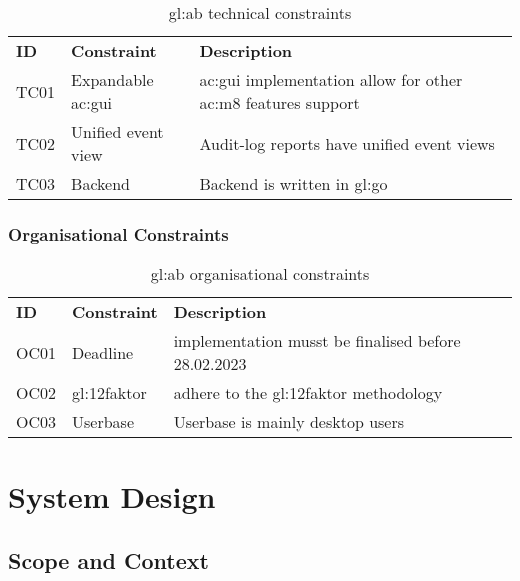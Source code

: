 \begin{table}[H]
  \begin{center}
    \label{tab:abtc}
    \def\arraystretch{1.5}
    \begin{tabularx}{\linewidth}{|l l X |}
      \hline
      \rowcolor{gray!20}
      \textbf{ID} & \textbf{Constraint} & \textbf{Description}\\
      TC01 & Expandable \gls{ac:gui} & \gls{ac:gui} implementation allow for other \gls{ac:m8} features support\\
      TC02 & Unified event view & Audit-log reports have unified event views\\
      TC03\label{tc:ab03} & Backend & Backend is written in \gls{gl:go}\\
      \hline
    \end{tabularx}
    \caption{\Gls{gl:ab} technical constraints}
  \end{center}
\end{table}

\subsubsection{Organisational Constraints}

\begin{table}[H]
  \begin{center}
    \label{tab:aboc}
    \def\arraystretch{1.5}
    \begin{tabularx}{\linewidth}{|l l X |}
      \hline
      \rowcolor{gray!20}
      \textbf{ID} & \textbf{Constraint} & \textbf{Description}\\
      OC01 & Deadline & implementation musst be finalised before 28.02.2023\\
      OC02 & \gls{gl:12faktor} & adhere to the \gls{gl:12faktor} methodology\\
      OC03 & Userbase & Userbase is mainly desktop users\\
      \hline
    \end{tabularx}
  \end{center}
  \caption{\Gls{gl:ab} organisational constraints}
\end{table}

\section{System Design}

\subsection{Scope and Context}


